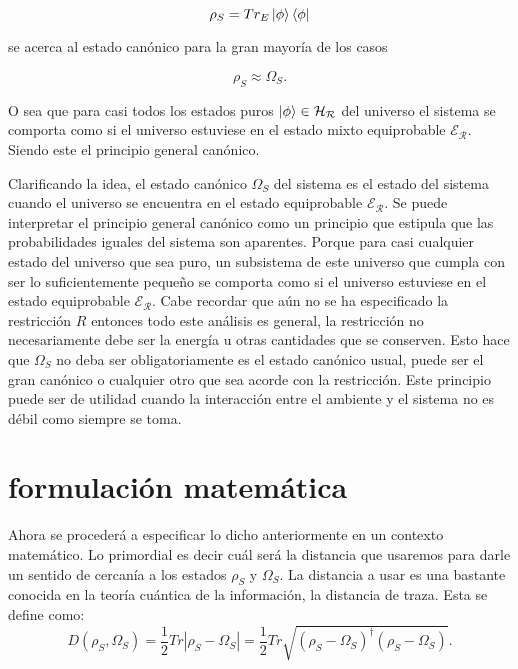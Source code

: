 \begin{equation}
\rho_{S}=Tr_{E}\ket{\phi}\bra{\phi} 
\end{equation}

se acerca al estado canónico para la gran mayoría de los casos 

\begin{equation}
\rho_{S} \approx \Omega_{S}.
\end{equation}

O sea que para casi todos los estados puros $\ket{\phi} \in \mathcal{H_{R}}$ del universo el sistema se comporta como si el universo estuviese en el estado mixto equiprobable $\mathcal{E_{R}}$. Siendo este el principio general canónico.

Clarificando la idea, el estado canónico $\Omega_{S}$ del sistema es el estado del sistema cuando el universo se encuentra en el estado equiprobable $\mathcal{E_{R}}$. Se puede interpretar el principio general canónico como un principio que estipula que las probabilidades iguales del sistema son aparentes. Porque para casi cualquier estado del universo que sea puro, un subsistema de este universo que cumpla con ser lo suficientemente pequeño se comporta como si el universo estuviese en el estado equiprobable $\mathcal{E_{R}}$. Cabe recordar que aún no se ha especificado la restricción $R$ entonces todo este análisis es general, la restricción no necesariamente debe ser la energía u otras cantidades que se conserven. Esto hace que $\Omega_{S}$ no  deba ser obligatoriamente es el estado canónico usual, puede ser el gran canónico o cualquier otro que sea acorde con la restricción. Este principio puede ser de utilidad cuando la interacción entre el ambiente y el sistema no es débil como siempre se toma.

\section{formulación matemática}

Ahora se procederá a especificar lo dicho anteriormente en un contexto matemático. Lo primordial es decir cuál será la distancia que usaremos para darle un sentido de cercanía a los estados $\rho_{S}$ y $\Omega_{S}$. La distancia a usar es una bastante conocida en la teoría cuántica de la información, la distancia de traza. Esta se define como:
\begin{equation}
D(\rho_{S}, \Omega_{S})= \frac{1}{2} Tr |\rho_{S} -\Omega_{S}|=\frac{1}{2}Tr\sqrt{(\rho_{S} -\Omega_{S})^{\dag}(\rho_{S} -\Omega_{S})}.
\end{equation}

